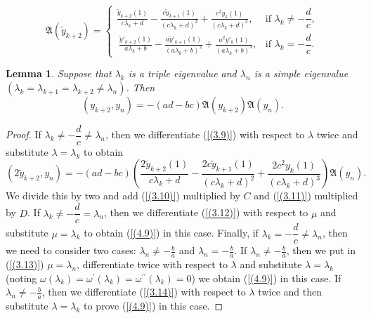 \documentclass[pdflatex,sn-mathphys-num]{sn-jnl}%
\theoremstyle{thmstyleone}%
\theoremstyle{thmstyletwo}%
\theoremstyle{thmstylethree}%
\newtheorem{lem}[thm]{Lemma}
\theoremstyle{definition}
\theoremstyle{remark}
\numberwithin{equation}{section}
\begin{document}
\begin{equation}
\mathfrak{A}(\tilde{y}_{k+2}) =
\begin{cases}
\displaystyle  
\frac{\tilde{y}_{k + 2}(1)}{c\lambda_{k} + d} - \frac{c\tilde{y}_{k+1}(1)}{\left( c\lambda_{k} + d \right)^{2}}
+\frac{c^2y_{k}(1)}{\left( c\lambda_{k} + d \right)^{3}}, 
&  \text{if }  \lambda_k \neq -\dfrac{d}{c}, \\[10pt]
\displaystyle \ 
\frac{\tilde{y}'_{k + 2}(1)}{a\lambda_{k} + b} - \frac{a\tilde{y}'_{k+1}(1)}{\left( a\lambda_{k} + b \right)^{2}}
+\frac{a^2y'_{k}(1)}{\left( a\lambda_{k} + b\right)^{3}}, 
& \text{if } \lambda_k = -\dfrac{d}{c}.
\end{cases}\label{(4.8)}
\end{equation}
\begin{lem}
Suppose that \(\lambda_{k}\) is a triple eigenvalue and \(\lambda_{n}\) is a simple  eigenvalue \((\lambda_{k}=\lambda_{k+1}=\lambda_{k+2}\ne\lambda_{n})\).
Then 
\begin{equation}
  \left( y_{k + 2},y_{n} \right) = - (ad - bc)\mathfrak{A}(y_{k+2})\mathfrak{A}(y_n)
.\label{(4.9)}  
\end{equation}
\end{lem}
\begin{proof}
If $\lambda_k \neq -\dfrac{d}{c}\neq\lambda_n$, then we differentiate (\ref{(3.9)}) with respect to $\lambda$ twice and substitute  $\lambda=\lambda_k$ to obtain
\begin{equation*}
\left( 2\tilde{y}_{k + 2},y_{n} \right) = - (ad - bc)\left(\frac{2\tilde{y}_{k + 2}(1)}{c\lambda_{k} + d} - \frac{2c\tilde{y}_{k+1}(1)}{\left( c\lambda_{k} + d \right)^{2}}
+\frac{2c^2y_{k}(1)}{\left( c\lambda_{k} + d \right)^{3}}\right)\mathfrak{A}(y_{n}). 
\end{equation*}
We divide this by two and add (\ref{(3.10)}) multiplied by $C$ and (\ref{(3.11)}) multiplied by $D$.
If $\lambda_k \neq -\dfrac{d}{c}=\lambda_n$, then we differentiate (\ref{(3.12)}) with respect to $\mu$ and substitute $\mu=\lambda_k$ to obtain (\ref{(4.9)}) in this case.
Finally, if $\lambda_k = -\dfrac{d}{c}\neq\lambda_n$, then we need to consider two cases: $\lambda_n\neq-\frac{b}{a}$ and $\lambda_n=-\frac{b}{a}$. If  $\lambda_n\neq-\frac{b}{a}$, then 
we put in (\ref{(3.13)}) $\mu=\lambda_n$, differentiate twice with respect to $\lambda$ and substitute $\lambda=\lambda_k$ (noting $\omega(\lambda_k)=\omega^\prime(\lambda_k)=\omega^{\prime\prime}(\lambda_k)=0$) we obtain (\ref{(4.9)}) in this case.
If  $\lambda_n\neq-\frac{b}{a}$, then we differentiate (\ref{(3.14)}) with respect to $\lambda$ twice and then substitute $\lambda=\lambda_k$ to prove (\ref{(4.9)}) in this case.
\end{proof}
\end{document}
